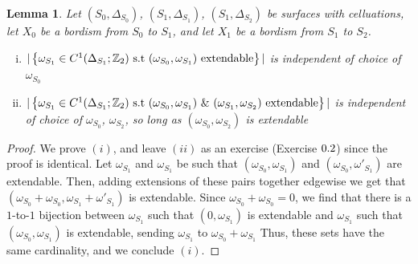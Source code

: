 \documentclass{article}
\newtheorem{lemma}{Lemma}[section]
\theoremstyle{definition}
\numberwithin{figure}{section}
\begin{document}
\begin{lemma}\label{independence} Let $(S_0,\Delta_{S_0})$, $(S_1,\Delta_{S_1})$, $(S_1,\Delta_{S_2})$ be surfaces with celluations, let $X_0$ be a bordism from $S_0$ to $S_1$, and let $X_1$ be a bordism from $S_1$ to $S_2$.

\begin{enumerate}[(i)]
\item $|\left\{\omega_{S_1}\in C^1(\Delta_{S_1};\mathbb{Z}_2) \,\,\mathrm{s.t}\,\, (\omega_{S_0},\omega_{S_1}) \text{ extendable}\right\}|$ is independent of choice of $\omega_{S_0}$
\item $|\left\{\omega_{S_1}\in C^1(\Delta_{S_1};\mathbb{Z}_2)\,\,\mathrm{s.t}\,\, (\omega_{S_0},\omega_{S_1})\,\, \& \,\,(\omega_{S_1},\omega_{S_2})\text{ extendable}\right\}|$ is independent of choice of $\omega_{S_0}$, $\omega_{S_2}$, so long as $(\omega_{S_0},\omega_{S_2})$ is extendable
\end{enumerate}
\end{lemma}
\begin{proof} We prove $(i)$, and leave $(ii)$ as an exercise (Exercise $\thesection.2$) since the proof is identical. Let $\omega_{S_1}$ and $\omega_{S_1}$ be such that $(\omega_{S_0},\omega_{S_1})$ and $(\omega_{S_0},\omega'_{S_1})$ are extendable. Then, adding extensions of these pairs together edgewise we get that $(\omega_{S_0}+\omega_{S_0},\omega_{S_1}+\omega'_{S_1})$ is extendable. Since $\omega_{S_0}+\omega_{S_0}=0$, we find that there is a $1$-to-$1$ bijection between $\omega_{S_1}$ such that $(0,\omega_{S_1})$ is extendable and $\omega_{S_1}$ such that $(\omega_{S_0},\omega_{S_1})$ is extendable, sending $\omega_{S_1}$ to $\omega_{S_0}+\omega_{S_1}$ Thus, these sets have the same cardinality, and we conclude $(i)$.
\end{proof}
\end{document}
